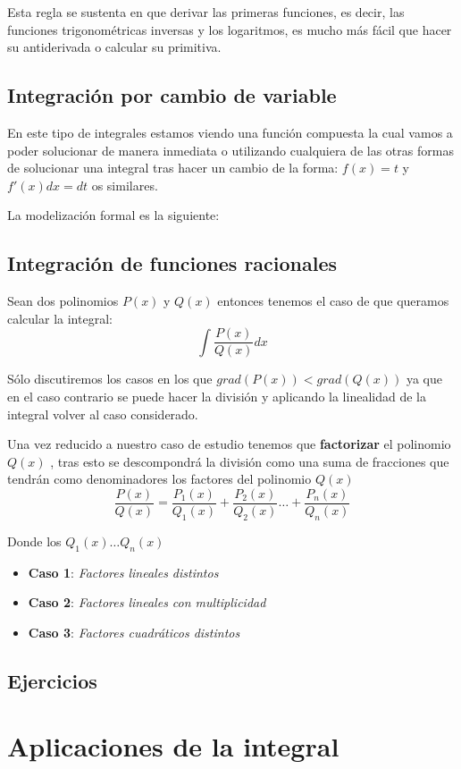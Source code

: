 Esta regla se sustenta en que derivar las primeras funciones, es decir, las funciones trigonométricas inversas y los logaritmos,  es mucho más fácil que hacer su antiderivada o calcular su primitiva. 

\subsection{Integración por cambio de variable}

En este tipo de integrales estamos viendo una función compuesta la cual vamos a poder solucionar de manera inmediata o utilizando cualquiera de las otras formas de solucionar una integral tras hacer un cambio de la forma:
$f(x)=t$ y $f'(x)dx=dt$ os similares. 

La modelización formal es la siguiente: 
\subsection{Integración de funciones racionales}
Sean dos polinomios $P(x)$ y $Q(x)$ entonces tenemos el caso de que queramos calcular la integral: 
$$
\int \dfrac{P(x)}{Q(x)}dx
$$

Sólo discutiremos los casos en los que $grad(P(x))< grad(Q(x))$ ya que en el caso contrario se puede hacer la división y aplicando la linealidad de la integral volver al caso considerado. 

Una vez reducido a nuestro caso de estudio tenemos que \textbf{factorizar} el polinomio $Q(x)$ , tras esto se descompondrá la división como una suma de fracciones que tendrán como denominadores los factores del polinomio $Q(x)$
\begin{equation}
\dfrac{P(x)}{Q(x)}=\dfrac{P_1(x)}{Q_1(x)}+\dfrac{P_2(x)}{Q_2(x)}\ldots +\dfrac{P_n(x)}{Q_n(x)}
\end{equation} 

Donde los $Q_1(x)\ldots Q_n(x)$
\begin{itemize}
\item \textbf{Caso 1}: \textit{Factores lineales distintos }
\item \textbf{Caso 2}: \textit{Factores lineales con multiplicidad}
\item \textbf{Caso 3}: \textit{Factores cuadráticos distintos}
\end{itemize}
\subsection{Ejercicios}
\section{Aplicaciones de la integral}



